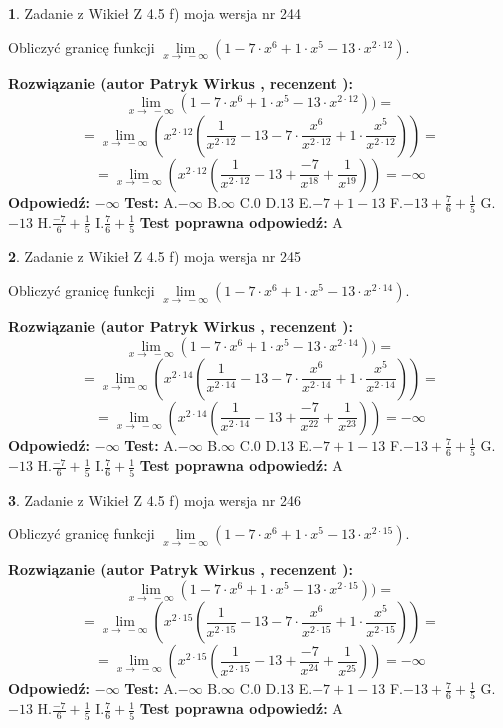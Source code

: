 \documentclass[12pt, a4paper]{article}
\theoremstyle{definition} %
\newtheorem{zad}{}
\newcommand{\zadStart}[1]{\begin{zad}#1\newline}
\newcommand{\zadStop}{\end{zad}}
\newcommand{\rozwStart}[2]{\noindent \textbf{Rozwiązanie (autor #1 , recenzent #2): }\newline}
\newcommand{\rozwStop}{\newline}
\newcommand{\odpStart}{\noindent \textbf{Odpowiedź:}\newline}
\newcommand{\odpStop}{\newline}
\newcommand{\testStart}{\noindent \textbf{Test:}\newline}
\newcommand{\testStop}{\newline}
\newcommand{\kluczStart}{\noindent \textbf{Test poprawna odpowiedź:}\newline}
\newcommand{\kluczStop}{\newline}
\begin{document}
\zadStart{Zadanie z Wikieł Z 4.5 f) moja wersja nr 244}



Obliczyć granicę funkcji  $\lim\limits_{x\to\ -\infty}(1 - 7 \cdot x^{6}+1 \cdot x^{5}- 13 \cdot x^{2\cdot12})$.
\zadStop
\rozwStart{Patryk Wirkus}{}
$$\lim\limits_{x\to\ -\infty}(1 - 7 \cdot x^{6}+1 \cdot x^{5}- 13 \cdot x^{2\cdot12}))=$$
$$=\lim\limits_{x\to\ -\infty}(x^{2\cdot12}(\frac{1}{x^{2\cdot12}}-13 -7 \cdot \frac{x^{6}}{x^{2\cdot12}}+1 \cdot \frac{x^{5}}{x^{2\cdot12}}))=$$
$$=\lim\limits_{x\to\ -\infty}(x^{2\cdot12}(\frac{1}{x^{2\cdot12}}-13 + \frac{-7}{x^{18}}+ \frac{1}{x^{19}}))=-\infty$$
\rozwStop
\odpStart
$-\infty$
\odpStop
\testStart
A.$-\infty$ B.$\infty$ C.$0$ D.$13$ E.$-7 + 1 - 13$
F.$-13+\frac{7}{6}+\frac{1}{5}$ G.$-13$
H.$\frac{-7}{6}+\frac{1}{5}$
I.$\frac{7}{6}+\frac{1}{5}$
\testStop
\kluczStart
A
\kluczStop



\zadStart{Zadanie z Wikieł Z 4.5 f) moja wersja nr 245}



Obliczyć granicę funkcji  $\lim\limits_{x\to\ -\infty}(1 - 7 \cdot x^{6}+1 \cdot x^{5}- 13 \cdot x^{2\cdot14})$.
\zadStop
\rozwStart{Patryk Wirkus}{}
$$\lim\limits_{x\to\ -\infty}(1 - 7 \cdot x^{6}+1 \cdot x^{5}- 13 \cdot x^{2\cdot14}))=$$
$$=\lim\limits_{x\to\ -\infty}(x^{2\cdot14}(\frac{1}{x^{2\cdot14}}-13 -7 \cdot \frac{x^{6}}{x^{2\cdot14}}+1 \cdot \frac{x^{5}}{x^{2\cdot14}}))=$$
$$=\lim\limits_{x\to\ -\infty}(x^{2\cdot14}(\frac{1}{x^{2\cdot14}}-13 + \frac{-7}{x^{22}}+ \frac{1}{x^{23}}))=-\infty$$
\rozwStop
\odpStart
$-\infty$
\odpStop
\testStart
A.$-\infty$ B.$\infty$ C.$0$ D.$13$ E.$-7 + 1 - 13$
F.$-13+\frac{7}{6}+\frac{1}{5}$ G.$-13$
H.$\frac{-7}{6}+\frac{1}{5}$
I.$\frac{7}{6}+\frac{1}{5}$
\testStop
\kluczStart
A
\kluczStop



\zadStart{Zadanie z Wikieł Z 4.5 f) moja wersja nr 246}



Obliczyć granicę funkcji  $\lim\limits_{x\to\ -\infty}(1 - 7 \cdot x^{6}+1 \cdot x^{5}- 13 \cdot x^{2\cdot15})$.
\zadStop
\rozwStart{Patryk Wirkus}{}
$$\lim\limits_{x\to\ -\infty}(1 - 7 \cdot x^{6}+1 \cdot x^{5}- 13 \cdot x^{2\cdot15}))=$$
$$=\lim\limits_{x\to\ -\infty}(x^{2\cdot15}(\frac{1}{x^{2\cdot15}}-13 -7 \cdot \frac{x^{6}}{x^{2\cdot15}}+1 \cdot \frac{x^{5}}{x^{2\cdot15}}))=$$
$$=\lim\limits_{x\to\ -\infty}(x^{2\cdot15}(\frac{1}{x^{2\cdot15}}-13 + \frac{-7}{x^{24}}+ \frac{1}{x^{25}}))=-\infty$$
\rozwStop
\odpStart
$-\infty$
\odpStop
\testStart
A.$-\infty$ B.$\infty$ C.$0$ D.$13$ E.$-7 + 1 - 13$
F.$-13+\frac{7}{6}+\frac{1}{5}$ G.$-13$
H.$\frac{-7}{6}+\frac{1}{5}$
I.$\frac{7}{6}+\frac{1}{5}$
\testStop
\kluczStart
A
\kluczStop
\end{document}
